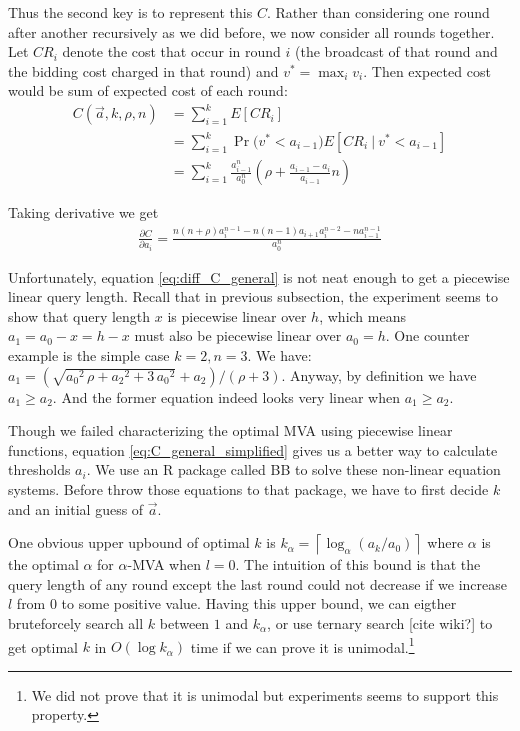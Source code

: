Thus the second key is to represent this $C$. Rather than
considering one round after another recursively as we did before, we now consider all
rounds together. Let $CR_i$ denote the cost that occur in round $i$ (the broadcast
of that round and the bidding cost charged in that round) and $v^* = \max_i v_i$. Then expected cost
would be sum of expected cost of each round:
\begin{align}
C(\vec a, k, \rho, n) &= \sum_{i=1}^k E[ CR_i ] \nonumber \\
  &= \sum_{i=1}^{k} \Pr\big( v^* < a_{i-1} \big) E[CR_i ~|~ v^* < a_{i-1}] \nonumber \\
  &= \sum_{i=1}^{k} \frac{a_{i-1}^n}{a_0^n} \left( \rho + \frac{a_{i-1}-a_{i}}{a_{i-1}} n \right)
  \label{eq:C_general_simplified}
\end{align}

Taking derivative we get
\begin{align}
 \frac{\partial C}{\partial a_i} = \frac{
	n(n+\rho)a_i^{n-1}-n(n-1)a_{i+1}a_i^{n-2}-n a_{i-1}^{n-1} }{a_0^n}
	\label{eq:diff_C_general}
\end{align}

Unfortunately, equation
\ref{eq:diff_C_general} is not neat enough to get a piecewise linear query length.
Recall that in previous subsection, the experiment seems to show that query length $x$ is
piecewise linear over $h$, which means $a_1 = a_0-x = h-x$ must also be
piecewise linear over $a_0 = h$.  One counter example is the simple case $k = 2, n =
3$. We have: $a_1 =
(\sqrt{{a_0}^{2}\,\rho+{a_2}^{2}+3\,{a_0}^{2}}+a_2)/(\rho+3)$.  Anyway, by
definition we have $a_1 \geq a_2$. And
the former equation indeed looks very linear when $a_1 \geq a_2$.

Though we failed characterizing the optimal MVA using piecewise linear
functions, equation \ref{eq:C_general_simplified} gives us a better way to
calculate thresholds $a_i$. We use an R package called BB \cite{Varadhan2009:BB} to
solve these non-linear equation systems. Before throw those equations to that
package, we have to first decide $k$ and an initial guess of $\vec a$.

One obvious upper upbound of optimal $k$ is $k_\alpha = \left\lceil \log_{\alpha}
\left(a_k/a_0\right) \right\rceil$ where $\alpha$ is the optimal $\alpha$ for
$\alpha$-MVA when $l = 0$. The intuition of this bound is that the query length
of any round except the last round could not decrease if we increase $l$ from $0$ to
some positive value. 
Having this upper bound, we can eigther bruteforcely
search all $k$ between $1$ and $k_\alpha$, or use ternary search [cite wiki?] to get optimal
$k$ in $O(\log k_\alpha)$ time if we can prove it is unimodal.\footnote{We
did not prove that it is unimodal but experiments seems to support this
property.}

